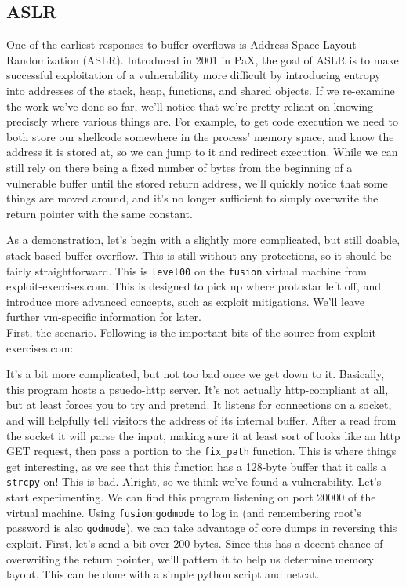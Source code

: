\subsection{ASLR}

One of the earliest responses to buffer overflows is Address Space Layout Randomization (ASLR).
Introduced in 2001 in PaX, the goal of ASLR is to make successful exploitation
of a vulnerability more difficult by introducing entropy into addresses
of the stack, heap, functions, and shared objects. If we re-examine
the work we've done so far, we'll notice that we're pretty reliant
on knowing precisely where various things are. For example, to get code
execution we need to both store our shellcode somewhere in the
process' memory space, and know the address it is stored at, so
we can jump to it and redirect execution. While we can still
rely on there being a fixed number of bytes from the beginning of
a vulnerable buffer until the stored return address, we'll quickly
notice that some things are moved around, and it's no longer
sufficient to simply overwrite the return pointer with the same constant.

As a demonstration, let's begin with a slightly more complicated, but
still doable, stack-based buffer overflow. This is still without
any protections, so it should be fairly straightforward. This is
\texttt{level00} on the \texttt{fusion} virtual machine from exploit-exercises.com.
This is designed to pick up where protostar left off, and introduce
more advanced concepts, such as exploit mitigations. We'll leave
further vm-specific information for later.\\

First, the scenario. Following is the important bits of the source 
from exploit-exercises.com:



It's a bit more complicated, but not too bad once we get down to it.
Basically, this program hosts a psuedo-http server. It's not
actually http-compliant at all, but at least forces you to try
and pretend. It listens for connections on a socket, and will
helpfully tell visitors the address of its internal buffer.
After a read from the socket it will parse the input, making
sure it at least sort of looks like an http GET request, then
pass a portion to the \texttt{fix\_path} function. This is where 
things get interesting, as we see that this function
has a 128-byte buffer that it calls a \texttt{strcpy} on! This
is bad. Alright, so we think we've found a vulnerability. Let's 
start experimenting. We can find this program listening on
port 20000 of the virtual machine. Using \texttt{fusion}:\texttt{godmode}
to log in (and remembering root's password is also \texttt{godmode}), we
can take advantage of core dumps in reversing this exploit.
First, let's send a bit over 200 bytes. Since this has a decent chance of 
overwriting the return pointer, we'll pattern it to help us 
determine memory layout. This can be done with a simple python script
and netcat.

